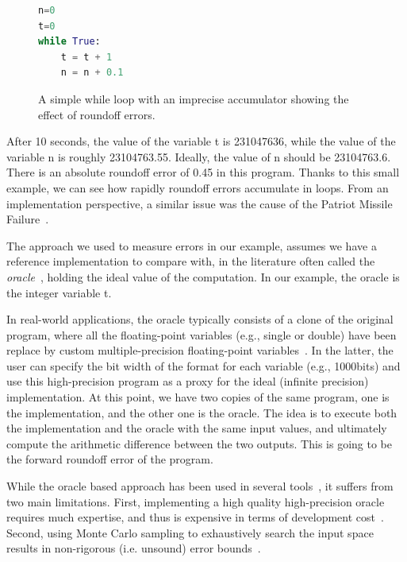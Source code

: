 %
\begin{figure}[h!]
	\begin{lstlisting}[frame=single, language=Python]
n=0
t=0
while True:
	t = t + 1
	n = n + 0.1
	\end{lstlisting}
	\caption{A simple while loop with an imprecise accumulator showing the effect of roundoff errors.}\label{fig:while}
\end{figure}
%
After 10 seconds, the value of the variable t is 231047636, while the value of the variable n is roughly 23104763.55.
%
Ideally, the value of n should be 23104763.6.
%
There is an absolute roundoff error of 0.45 in this program.
%
Thanks to this small example, we can see how rapidly roundoff errors accumulate in loops. 
%
From an implementation perspective, a similar issue was the cause of the Patriot Missile Failure~\cite{patriot}.
%

%
%

The approach we used to measure errors in our example, assumes we have a reference implementation to compare with, in the literature often called the \emph{oracle}~\cite{blame}, holding the ideal value of the computation.
%
In our example, the oracle is the integer variable t.
% 

In real-world applications, the oracle typically consists of a clone of the original program, where all the floating-point variables (e.g., single or double) have been replace by custom multiple-precision floating-point variables~\cite{mpfr}.
%
In the latter, the user can specify the bit width of the format for each variable (e.g., 1000bits) and use this high-precision program as a proxy for the ideal (infinite precision) implementation.
%
At this point, we have two copies of the same program, one is the implementation, and the other one is the oracle. 
%
The idea is to execute both the implementation and the oracle with the same input values, and ultimately compute the arithmetic difference between the two outputs. 
%
This is going to be the forward roundoff error of the program. 
%

While the oracle based approach has been used in several tools~\cite{landau2014guide, kahan1996improbability, atomic, blame, herbie}, it suffers from two main limitations.
%
First, implementing a high quality high-precision oracle requires much expertise, and thus is expensive in terms of development cost~\cite{atomic}.
%
Second, using Monte Carlo sampling to exhaustively search the input space results in non-rigorous (i.e. unsound) error bounds~\cite{glasserman2013monte, parker2000monte}.
%


